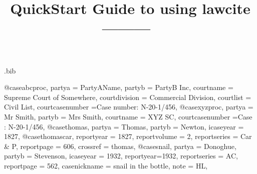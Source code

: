 \begin{filecontents*}[overwrite]{\jobname.bib}

@case{abcproc,
  partya = {PartyAName},
  partyb = {PartyB Inc},
  courtname = {Supreme Court of Somewhere},
  courtdivision = {Commercial Division},
  courtlist = {Civil List},
  courtcasenumber ={Case number: N-20-1/456},
}
@case{xyzproc,
  partya = {Mr Smith},
  partyb = {Mrs Smith},
  courtname = {XYZ SC},
  courtcasenumber ={Case : N-20-1/456},
}
@case{thomas,
  partya = {Thomas},
  partyb = {Newton},
  icaseyear = {1827},
	}
@case{thomascar,
  reportyear = {1827},
  reportvolume = {2},
  reportseries = {Car \& P},
  reportpage = {606},
  crossref = {thomas},
}
@case{snail,
  partya = {Donoghue}, 
  partyb = {Stevenson},
  icaseyear = {1932},
  reportyear={1932},
  reportseries = {AC},
  reportpage = {562},
  casenickname = {snail in the bottle},
  note = {HL},
	}

\end{filecontents*}

\documentclass[12pt]{article}
\title{QuickStart Guide to using lawcite\\[24pt]\normalsize \hfill ---------\hfill\ }
\author{}
\date{}
\newcommand\rulesep{\rule{0.4\textwidth}{.4pt}}
\usepackage{pdfpages}
\usepackage{xcolor}
\usepackage{fontspec}
\setmainfont{Noto Serif}
\setsansfont{Noto Sans}
\setmonofont{Noto Sans Mono}[Colour=blue]
\newfontface{}
\newcommand\goodoh{{\large\ftmark 🗸}}
\newcommand\notsogoodoh{{\large\ftmark 🗶}}
\usepackage{fancyhdr} %


\newcommand\bpn{\textcolor{white}{\raisebox{-3pt}{\rule{40pt}{15pt}}}}

\renewcommand{\headrulewidth}{0.0pt} %
\newcommand{\myfooter}{              %
    \fancyfoot{}
    \fancyfoot[C]{\bpn \rlap{\kern-24pt\thepage}}
}



%



